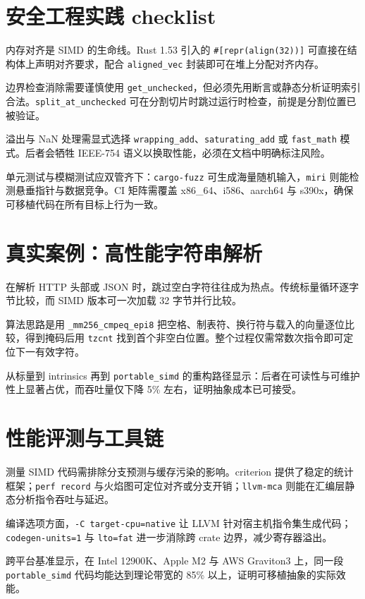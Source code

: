 \chapter{安全工程实践 checklist}
内存对齐是 SIMD 的生命线。Rust 1.53 引入的 \texttt{\#{}[repr(align(32))]} 可直接在结构体上声明对齐要求，配合 \texttt{aligned\_{}vec} 封装即可在堆上分配对齐内存。\par
边界检查消除需要谨慎使用 \texttt{get\_{}unchecked}，但必须先用断言或静态分析证明索引合法。\texttt{split\_{}at\_{}unchecked} 可在分割切片时跳过运行时检查，前提是分割位置已被验证。\par
溢出与 NaN 处理需显式选择 \texttt{wrapping\_{}add}、\texttt{saturating\_{}add} 或 \texttt{fast\_{}math} 模式。后者会牺牲 IEEE-754 语义以换取性能，必须在文档中明确标注风险。\par
单元测试与模糊测试应双管齐下：\texttt{cargo-fuzz} 可生成海量随机输入，\texttt{miri} 则能检测悬垂指针与数据竞争。CI 矩阵需覆盖 x86\_{}64、i586、aarch64 与 s390x，确保可移植代码在所有目标上行为一致。\par
\chapter{真实案例：高性能字符串解析}
在解析 HTTP 头部或 JSON 时，跳过空白字符往往成为热点。传统标量循环逐字节比较，而 SIMD 版本可一次加载 32 字节并行比较。\par
算法思路是用 \texttt{\_{}mm256\_{}cmpeq\_{}epi8} 把空格、制表符、换行符与载入的向量逐位比较，得到掩码后用 \texttt{tzcnt} 找到首个非空白位置。整个过程仅需常数次指令即可定位下一有效字符。\par
从标量到 intrinsics 再到 \texttt{portable\_{}simd} 的重构路径显示：后者在可读性与可维护性上显著占优，而吞吐量仅下降 5\%{} 左右，证明抽象成本已可接受。\par
\chapter{性能评测与工具链}
测量 SIMD 代码需排除分支预测与缓存污染的影响。criterion 提供了稳定的统计框架；\texttt{perf record} 与火焰图可定位对齐或分支开销；\texttt{llvm-mca} 则能在汇编层静态分析指令吞吐与延迟。\par
编译选项方面，\texttt{-C target-cpu=native} 让 LLVM 针对宿主机指令集生成代码；\texttt{codegen-units=1} 与 \texttt{lto=fat} 进一步消除跨 crate 边界，减少寄存器溢出。\par
跨平台基准显示，在 Intel 12900K、Apple M2 与 AWS Graviton3 上，同一段 \texttt{portable\_{}simd} 代码均能达到理论带宽的 85\%{} 以上，证明可移植抽象的实际效能。\par
